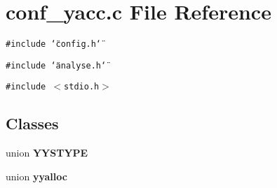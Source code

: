 \section{conf\_\-yacc.c File Reference}
\label{conf__yacc_8c}
{\tt \#include \char`\"{}config.h\char`\"{}}\par
{\tt \#include \char`\"{}analyse.h\char`\"{}}\par
{\tt \#include $<$stdio.h$>$}\par
\subsection*{Classes}
\begin{CompactItemize}
\item 
union {\bf YYSTYPE}
\item 
union {\bf yyalloc}
\end{CompactItemize}

